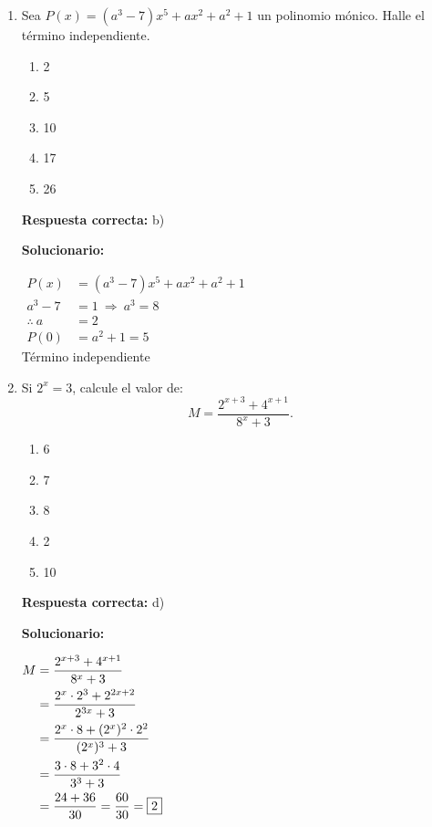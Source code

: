 \begin{enumerate}[resume]

	\item Sea $P(x)=(a^3-7)x^5+ax^2+a^2+1$ un polinomio mónico. Halle el término independiente.

	\begin{enumerate}[label=\alph*)]
		\item 2
		\item 5
		\item 10
		\item 17
		\item 26
	\end{enumerate}

	\textbf{Respuesta correcta:} b)

	\vspace{2mm}
	\textbf{Solucionario:}

	$
	\begin{aligned}
		P(x) &= (a^3-7)x^5+ax^2+a^2+1\\
		a^3-7 &= 1 \ \Rightarrow\ a^3=8\\
		\therefore\ a &= 2\\
		P(0) &= a^2+1 = 5
	\end{aligned}
	$
	\\
	Término independiente 


	\item Si $2^x=3$, calcule el valor de:
	\[
	M=\dfrac{2^{x+3}+4^{x+1}}{8^x+3}.
	\]

	\begin{enumerate}[label=\alph*)]
		\item 6
		\item 7
		\item 8
		\item 2
		\item 10
	\end{enumerate}

	\textbf{Respuesta correcta:} d)

	\vspace{2mm}
	\textbf{Solucionario:}

	$
	\begin{aligned}
		M &= \dfrac{2^{x+3}+4^{x+1}}{8^x+3}\\
		&= \dfrac{2^x\cdot 2^3 + 2^{2x+2}}{2^{3x}+3}\\
		&= \dfrac{2^x\cdot 8 + (2^x)^2\cdot 2^2}{(2^x)^3+3}\\
		&= \dfrac{3\cdot 8 + 3^2\cdot 4}{3^3+3}\\
		&= \dfrac{24+36}{30}=\dfrac{60}{30}=\fbox{2}
	\end{aligned}
	$


\end{enumerate}
